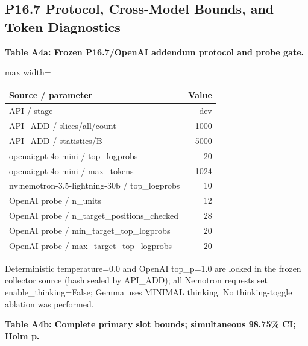 \documentclass[11pt,a4paper]{article}
\begin{document}
\subsection{P16.7 Protocol, Cross-Model Bounds, and Token Diagnostics}

\textbf{Table A4a: Frozen P16.7/OpenAI addendum protocol and probe gate.}

\begin{center}\begingroup\small\setlength{\tabcolsep}{4.5pt}\renewcommand{\arraystretch}{1.12}\begin{adjustbox}{max width=\textwidth}\begin{tabular}{lr}\toprule
\textbf{Source / parameter} & \textbf{Value} \\ \midrule
API / stage & dev \\
API\_\allowbreak{}ADD / slices/all/count & 1000 \\
API\_\allowbreak{}ADD / statistics/B & 5000 \\
openai:gpt-4o-mini / top\_\allowbreak{}logprobs & 20 \\
openai:gpt-4o-mini / max\_\allowbreak{}tokens & 1024 \\
nv:nemotron-3.5-lightning-30b / top\_\allowbreak{}logprobs & 10 \\
OpenAI probe / n\_\allowbreak{}units & 12 \\
OpenAI probe / n\_\allowbreak{}target\_\allowbreak{}positions\_\allowbreak{}checked & 28 \\
OpenAI probe / min\_\allowbreak{}target\_\allowbreak{}top\_\allowbreak{}logprobs & 20 \\
OpenAI probe / max\_\allowbreak{}target\_\allowbreak{}top\_\allowbreak{}logprobs & 20 \\
\bottomrule\end{tabular}\end{adjustbox}\endgroup\end{center}

Deterministic temperature=0.0 and OpenAI top\_\allowbreak{}p=1.0 are locked in the frozen collector source (hash sealed by API\_\allowbreak{}ADD); all Nemotron requests set enable\_\allowbreak{}thinking=False; Gemma uses MINIMAL thinking. No thinking-toggle ablation was performed.

\textbf{Table A4b: Complete primary slot bounds; simultaneous 98.75\% CI; Holm p.}
\end{document}
